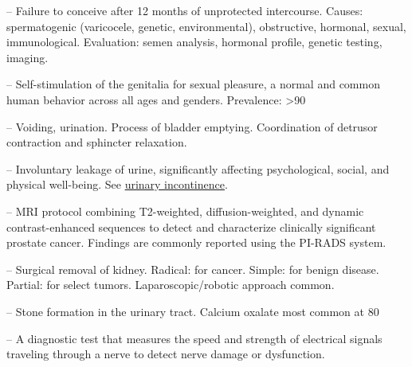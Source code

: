 -- Failure to conceive after 12 months of unprotected intercourse. Causes: spermatogenic (varicocele, genetic, environmental), obstructive, hormonal, sexual, immunological. Evaluation: semen analysis, hormonal profile, genetic testing, imaging.

-- Self-stimulation of the genitalia for sexual pleasure, a normal and common human behavior across all ages and genders. Prevalence: >90%

-- Voiding, urination. Process of bladder emptying. Coordination of detrusor contraction and sphincter relaxation.

-- Involuntary leakage of urine, significantly affecting psychological, social, and physical well-being. See \hyperlink{Urinary Incontinence}{urinary incontinence}.

-- MRI protocol combining T2-weighted, diffusion-weighted, and dynamic contrast-enhanced sequences to detect and characterize clinically significant prostate cancer. Findings are commonly reported using the PI-RADS system.

-- Surgical removal of kidney. Radical: for cancer. Simple: for benign disease. Partial: for select tumors. Laparoscopic/robotic approach common.

-- Stone formation in the urinary tract. Calcium oxalate most common at 80%

-- A diagnostic test that measures the speed and strength of electrical signals traveling through a nerve to detect nerve damage or dysfunction.


